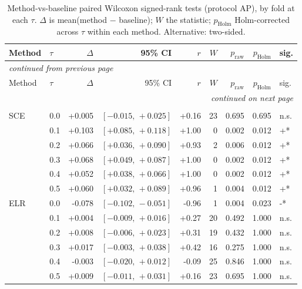 
\begin{small}
\setlength{\LTcapwidth}{\textwidth}
\begin{longtable}{llrrrrrrl}
\caption{Method-vs-baseline paired Wilcoxon signed-rank tests (protocol AP), by fold at each $\tau$. $\Delta$ is mean(method $-$ baseline); $W$ the statistic; $p_{\mathrm{Holm}}$ Holm-corrected across $\tau$ within each method. Alternative: two-sided.}\label{tab:app_mvb_wilcoxon_AP}\\
\toprule
Method & $\tau$ & $\Delta$ & 95\% CI & $r$ & $W$ & $p_{\mathrm{raw}}$ & $p_{\mathrm{Holm}}$ & sig. \\
\midrule
\endfirsthead
\multicolumn{9}{l}{\itshape\small continued from previous page}\\
\toprule
Method & $\tau$ & $\Delta$ & 95\% CI & $r$ & $W$ & $p_{\mathrm{raw}}$ & $p_{\mathrm{Holm}}$ & sig. \\
\midrule
\endhead
\midrule
\multicolumn{9}{r}{\itshape\small continued on next page}\\
\endfoot
\bottomrule
\endlastfoot
\addlinespace
\multicolumn{9}{l}{\textit{Balanced accuracy}} \\
SCE & 0.0 & +0.005 & $[-0.015,\,+0.025]$ & +0.16 & 23 & 0.695 & 0.695 & n.s. \\
 & 0.1 & +0.103 & $[+0.085,\,+0.118]$ & +1.00 & 0 & 0.002 & 0.012 & +* \\
 & 0.2 & +0.066 & $[+0.036,\,+0.090]$ & +0.93 & 2 & 0.006 & 0.012 & +* \\
 & 0.3 & +0.068 & $[+0.049,\,+0.087]$ & +1.00 & 0 & 0.002 & 0.012 & +* \\
 & 0.4 & +0.052 & $[+0.038,\,+0.066]$ & +1.00 & 0 & 0.002 & 0.012 & +* \\
 & 0.5 & +0.060 & $[+0.032,\,+0.089]$ & +0.96 & 1 & 0.004 & 0.012 & +* \\
ELR & 0.0 & -0.078 & $[-0.102,\,-0.051]$ & -0.96 & 1 & 0.004 & 0.023 & -* \\
 & 0.1 & +0.004 & $[-0.009,\,+0.016]$ & +0.27 & 20 & 0.492 & 1.000 & n.s. \\
 & 0.2 & +0.008 & $[-0.006,\,+0.023]$ & +0.31 & 19 & 0.432 & 1.000 & n.s. \\
 & 0.3 & +0.017 & $[-0.003,\,+0.038]$ & +0.42 & 16 & 0.275 & 1.000 & n.s. \\
 & 0.4 & -0.003 & $[-0.020,\,+0.012]$ & -0.09 & 25 & 0.846 & 1.000 & n.s. \\
 & 0.5 & +0.009 & $[-0.011,\,+0.031]$ & +0.16 & 23 & 0.695 & 1.000 & n.s. \\

\end{longtable}
\end{small}
